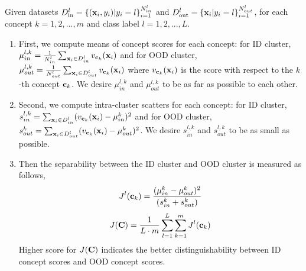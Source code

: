 \iffalse


Given datasets $D_{\text{in}}^{l} = \{(\mathbf{x}_i, y_i) | y_i = l\}_{i=1}^{N_{in}^{l}}$ and $D_{\text{out}}^{l} = \{\mathbf{x}_i | y_i = l\}_{i=1}^{N_{out}^{l}}$, for each concept $k = 1, 2, ..., m$ and class label $l = 1, 2, ..., L$.
\begin{enumerate}
\item First, we compute means of concept scores for each concept: for ID cluster, $\mu_{in}^{l, k} = \frac{1}{N_{in}^l}\sum_{\mathbf{x}_i \in D^{l}_{in}} v_{\mathbf{c}_k}(\mathbf{x}_i)$ and for OOD cluster, $\mu_{out}^{l, k} = \frac{1}{N_{out}^l}\sum_{\mathbf{x}_i \in D^{l}_{out}} v_{\mathbf{c}_k}(\mathbf{x}_i)$ where $v_{\mathbf{c}_k}(\mathbf{x}_i)$ is the score with respect to the $k$-th concept $\mathbf{c}_k$.
We desire $\mu_{in}^{l, k}$ and $\mu_{out}^{l, k}$ to be as far as possible to each other.
\item Second, we compute intra-cluster scatters for each concept: for ID cluster, $s_{in}^{l, k} = \sum_{\mathbf{x}_i \in D^{l}_{in}} (v_{\mathbf{c}_k}(\mathbf{x}_i) - \mu_{in}^k)^2$ and for OOD cluster, $s_{out}^k = \sum_{\mathbf{x}_i \in D^{l}_{out}} (v_{\mathbf{c}_k}(\mathbf{x}_i) - \mu_{out}^k)^2$.
We desire $s_{in}^{l,k}$ and $s_{out}^{l,k}$ to be as small as possible.
\item Then the separability between the ID cluster and OOD cluster is measured as follows,
\begin{equation*}
    J^l(\mathbf{c}_k) = \frac{(\mu_{in}^k - \mu_{out}^k)^2}{(s_{in}^k + s_{out}^k)}
\end{equation*}
\begin{equation}
\label{equ: separability}
    J(\mathbf{C}) = \frac{1}{L \cdot m}\sum_{l=1}^L\sum_{k=1}^m J^l(\mathbf{c}_k)
\end{equation}
Higher score for $J(\mathbf{C})$ indicates the better distinguishability between ID concept scores and OOD concept scores.
\end{enumerate}

